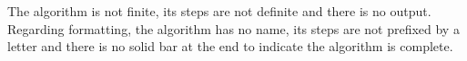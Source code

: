 The algorithm is not finite, its steps are not definite and there is no output.
Regarding formatting, the algorithm has no name, its steps are not prefixed by a letter
and there is no solid bar at the end to indicate the algorithm is complete.